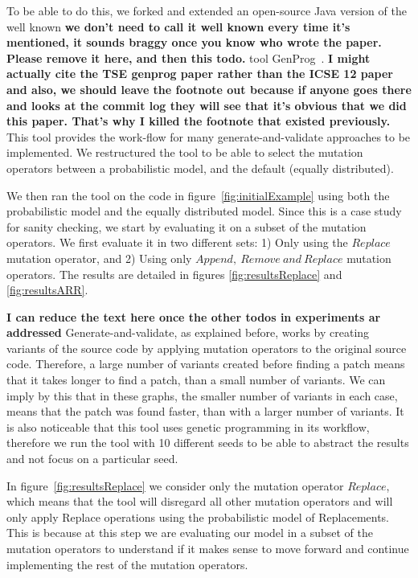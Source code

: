 \documentclass[conference]{IEEEtran}
\newcommand{\todo}[1]
  {{\scriptsize \textbf{\color{red} {#1}}}}
\begin{document}
{To be able to do this, we forked and extended an open-source Java version of the 
well known\todo{we don't need to call it well known every time it's mentioned,
  it sounds braggy once you know who wrote the paper.  Please remove it here,
  and then this todo.} tool GenProg~\cite{legoues12}.\todo{I might actually cite the TSE
  genprog paper rather than the ICSE 12 paper and also, we should leave the
  footnote out because if anyone goes there and looks at the commit log they
  will see that it's obvious that we did this paper.  That's why I killed the
  footnote that existed previously.} This tool provides the work-flow 
for many generate-and-validate approaches to be implemented. We restructured the 
tool to be able to select the mutation operators between a 
probabilistic model, and the default (equally distributed).

We then ran the tool on the code in figure~\ref{fig:initialExample} using both 
the probabilistic model and the equally distributed model. Since this is a 
case study for sanity checking, we start by evaluating it on a subset of 
the mutation operators. We first evaluate it in two different sets: 1) Only using the $Replace$ mutation operator, and 2) Using only $Append,~
Remove~and~Replace$ mutation operators. The results are detailed in figures 
\ref{fig:resultsReplace} and \ref{fig:resultsARR}. 

\todo{I can reduce the text here once the other todos in experiments ar addressed}
Generate-and-validate, as explained before, works by creating variants of the 
source code by applying mutation operators to the original source code. 
Therefore, a large number of variants created before finding a patch means that 
it takes longer to find a patch, than a small number of variants. We can imply by this 
that in these graphs, the smaller number of variants in each case, means that 
the patch was found faster, than with a larger number of variants. It is also 
noticeable that this tool uses genetic programming in its workflow, therefore we 
run the tool with 10 different seeds to be able to abstract the results 
and not focus on a particular seed.

In figure~\ref{fig:resultsReplace} we consider only the mutation operator 
$Replace$, which means that the tool will disregard all other mutation 
operators and will only apply Replace operations using the probabilistic model 
of Replacements. This is because at this step we are evaluating our model in a 
subset of the mutation operators to understand if it makes sense to move forward and 
continue implementing the rest of the mutation operators.

}
\end{document}

